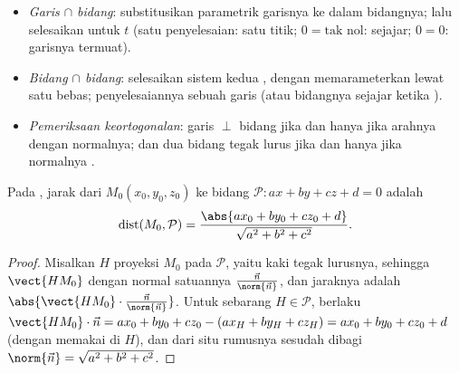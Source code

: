 \begin{method}\label{met:g12:space:intersections}
\begin{itemize}
  \item \emph{Garis $\cap$ bidang}: substitusikan  parametrik
        garisnya ke dalam  bidangnya; lalu selesaikan untuk $t$ (satu
        penyelesaian: satu titik; $0 = \text{tak nol}$: sejajar; $0 = 0$: garisnya termuat).
  \item \emph{Bidang $\cap$ bidang}: selesaikan sistem kedua ,
        dengan memarameterkan lewat satu  bebas; penyelesaiannya sebuah garis
        (atau bidangnya sejajar ketika  ).
  \item \emph{Pemeriksaan keortogonalan}: garis $\perp$ bidang jika dan hanya jika
        arahnya  dengan normalnya; dan dua bidang tegak lurus jika dan hanya
        jika normalnya .
\end{itemize}
\end{method}

\begin{proposition}\label{prop:g12:space:distance}
Pada , jarak dari $M_0(x_0, y_0, z_0)$ ke
bidang $\mathcal P : ax + by + cz + d = 0$ adalah
\[
\operatorname{dist}(M_0, \mathcal P)
= \frac{\abs{ax_0 + by_0 + cz_0 + d}}{\sqrt{a^2 + b^2 + c^2}}.
\]
\end{proposition}

\begin{proof}
Misalkan $H$ proyeksi  $M_0$ pada $\mathcal P$, yaitu kaki
tegak lurusnya, sehingga $\vect{HM_0}$  dengan normal satuannya
$\frac{\vec n}{\norm{\vec n}}$, dan jaraknya adalah
$\abs{\vect{HM_0}\cdot \frac{\vec n}{\norm{\vec n}}}$. Untuk sebarang
$H \in \mathcal P$, berlaku
$\vect{HM_0}\cdot\vec n = ax_0 + by_0 + cz_0 - (ax_H + by_H + cz_H)
= ax_0 + by_0 + cz_0 + d$ (dengan memakai  di $H$), dan dari situ
rumusnya sesudah dibagi $\norm{\vec n} = \sqrt{a^2+b^2+c^2}$.
\end{proof}

